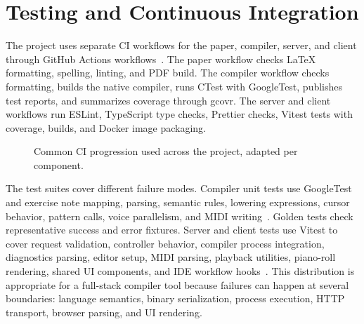 \section{Testing and Continuous Integration}\label{sec:testing-ci}

The project uses separate CI workflows for the paper, compiler, server, and client through GitHub Actions
workflows~\cite{GitHub_Actions_2026}.
The paper workflow checks LaTeX formatting, spelling, linting, and PDF build.
The compiler workflow checks formatting, builds the native compiler, runs CTest with GoogleTest, publishes test reports,
and summarizes coverage through gcovr.
The server and client workflows run ESLint, TypeScript type checks, Prettier checks, Vitest tests with coverage, builds,
and Docker image packaging.

\begin{figure}[htbp]
  \centering
  \caption{Common CI progression used across the project, adapted per component.}\label{fig:ci-flow}
\end{figure}

The test suites cover different failure modes.
Compiler unit tests use GoogleTest and exercise note mapping, parsing, semantic rules, lowering expressions, cursor
behavior, pattern calls, voice parallelism, and MIDI writing~\cite{GoogleTest_2026}.
Golden tests check representative success and error fixtures.
Server and client tests use Vitest to cover request validation, controller behavior, compiler process integration,
diagnostics parsing, editor setup, MIDI parsing, playback utilities, piano-roll rendering, shared UI components, and IDE
workflow hooks~\cite{Vitest_2026}.
This distribution is appropriate for a full-stack compiler tool because failures can happen at several
boundaries: language semantics, binary serialization, process execution, HTTP transport, browser parsing, and
UI rendering.

